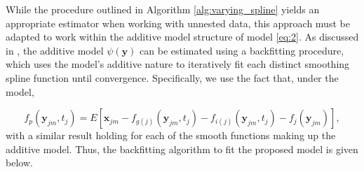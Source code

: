 \documentclass[11pt,reqno]{article}
\theoremstyle{definition}
\begin{document}
While the procedure outlined in Algorithm \ref{alg:varying_spline} yields an appropriate estimator when working with unnested data, this approach must be adapted to work within the additive model structure of model \ref{eq:2}. As discussed in \cite{hastieGeneralizedAdditiveModels1990}, the additive model $\psi(\mathbf{y})$ can be estimated using a backfitting procedure, which uses the model's additive nature to iteratively fit each distinct smoothing spline function until convergence. Specifically, we use the fact that, under the model,

\[%
  f_p(\mathbf{y}_{jm}, t_{j}) = E\left[\mathbf{x}_{jm} - f_{g(j)}(\mathbf{y}_{jm}, t_{j}) - f_{i(j)}(\mathbf{y}_{jm}, t_{j}) - f_{j}(\mathbf{y}_{jm})\right]
,\]%
with a similar result holding for each of the smooth functions making up the additive model. Thus, the backfitting algorithm to fit the proposed model is given below.
\end{document}
